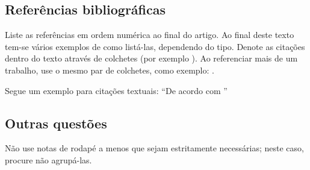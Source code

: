 
\subsection{Referências bibliográficas}

Liste as referências em ordem numérica ao final do artigo. Ao final deste texto tem-se vários exemplos de como listá-las, dependendo do tipo. Denote as citações dentro do texto através de colchetes (por exemplo \cite{LIMA2018}). Ao referenciar mais de um trabalho, use o mesmo par de colchetes, como exemplo: \cite{LUCKMANN2008,livro-unoesc,NR10,abntex2modelo}. 

Segue um exemplo para citações textuais: ``De acordo com \textcite{CHAPMAN2013}'' 

\subsection{Outras questões}
Não use notas de rodapé a menos que sejam estritamente necessárias; neste caso, procure não agrupá-las. 